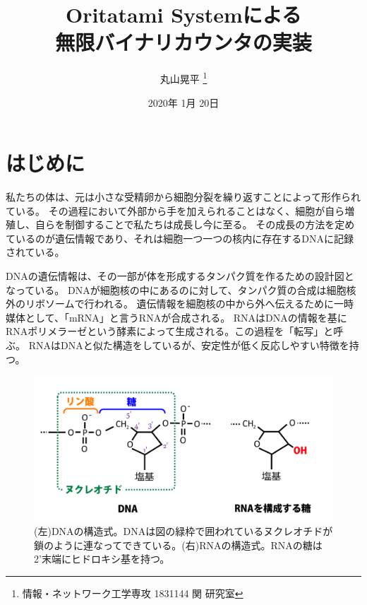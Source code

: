 \documentclass[a4,11pt]{article}
\title{Oritatami Systemによる\\無限バイナリカウンタの実装}
\author{丸山晃平
\thanks{情報・ネットワーク工学専攻 1831144 関 研究室}
}
\date{2020年 1月 20日}%
\begin{document}
\maketitle

\thispagestyle{empty}
\newpage
\tableofcontents
\newpage

\section{はじめに}
%

私たちの体は、元は小さな受精卵から細胞分裂を繰り返すことによって形作られている。
その過程において外部から手を加えられることはなく、細胞が自ら増殖し、自らを制御することで私たちは成長し今に至る。
その成長の方法を定めているのが遺伝情報であり、それは細胞一つ一つの核内に存在するDNAに記録されている。

DNAの遺伝情報は、その一部が体を形成するタンパク質を作るための設計図となっている。
DNAが細胞核の中にあるのに対して、タンパク質の合成は細胞核外のリボソームで行われる。
遺伝情報を細胞核の中から外へ伝えるために一時媒体として、「mRNA」と言うRNAが合成される。
RNAはDNAの情報を基にRNAポリメラーゼという酵素によって生成される。この過程を「転写」と呼ぶ。
RNAはDNAと似た構造をしているが、安定性が低く反応しやすい特徴を持つ。

\begin{figure}[h]
  \centering
  \includegraphics[width=\textwidth]{fig/dnarna.png}
  \caption{(左)DNAの構造式。DNAは図の緑枠で囲われているヌクレオチドが鎖のように連なってできている。(右)RNAの構造式。RNAの糖は2'末端にヒドロキシ基を持つ。}
  \label{dnarna}
\end{figure}
\end{document}
